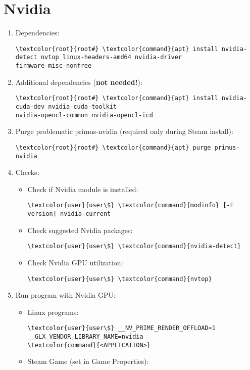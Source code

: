 \documentclass[10pt, a4paper, onecolumn, openany]{book} %
\begin{document}
\section{Nvidia}
\begin{enumerate}
    \item Dependencies:
\begin{Verbatim}[commandchars=\\\{\}]
\textcolor{root}{root#} \textcolor{command}{apt} install nvidia-detect nvtop linux-headers-amd64 nvidia-driver 
firmware-misc-nonfree
\end{Verbatim}    
    \item Additional dependencies (\textbf{not needed!}):
\begin{Verbatim}[commandchars=\\\{\}]
\textcolor{root}{root#} \textcolor{command}{apt} install nvidia-cuda-dev nvidia-cuda-toolkit 
nvidia-opencl-common nvidia-opencl-icd
\end{Verbatim}
    \item Purge problematic primus-nvidia (required only during Steam install):
\begin{Verbatim}[commandchars=\\\{\}]
\textcolor{root}{root#} \textcolor{command}{apt} purge primus-nvidia
\end{Verbatim}
    \item Checks:
\begin{itemize}
    \item Check if Nvidia module is installed:
\begin{Verbatim}[commandchars=\\\{\}]
\textcolor{user}{user\$} \textcolor{command}{modinfo} [-F version] nvidia-current
\end{Verbatim}
    \item Check suggested Nvidia packages:
\begin{Verbatim}[commandchars=\\\{\}]
\textcolor{user}{user\$} \textcolor{command}{nvidia-detect}
\end{Verbatim}
    \item Check Nvidia GPU utilization:
\begin{Verbatim}[commandchars=\\\{\}]
\textcolor{user}{user\$} \textcolor{command}{nvtop}
\end{Verbatim}
\end{itemize}
    \item Run program with Nvidia GPU:
\begin{itemize}
    \item Linux programs:
\begin{Verbatim}[commandchars=\\\{\}]
\textcolor{user}{user\$} __NV_PRIME_RENDER_OFFLOAD=1 __GLX_VENDOR_LIBRARY_NAME=nvidia 
\textcolor{command}{<APPLICATION>}
\end{Verbatim}
    \item Steam Game (set in Game Properties):
\begin{Verbatim}[commandchars=\\\{\}]


\end{Verbatim}
\end{itemize}
\end{enumerate}
\end{document}
